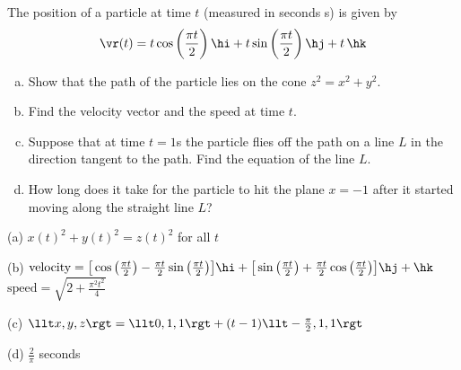 \begin{question} [M200 2002D] %
The position of a particle at time $t$ (measured in seconds s) 
is given by
\begin{equation*}
\vr(t)=t\cos\left(\frac{\pi t}{2}\right)\hi
         +t\sin\left(\frac{\pi t}{2}\right)\hj +t\,\hk
\end{equation*}
\begin{enumerate}[(a)]
\item
Show that the path of the particle lies on the cone $z^2=x^2+y^2$.
\item
Find the velocity vector and the speed at time $t$.
\item
Suppose that at time $t=1$s the particle flies off the path
on a line $L$ in the direction tangent to the path. Find the equation of
the line $L$.
\item
How long does it take for the particle to hit the plane $x=-1$
after it started moving along the straight line $L$?
\end{enumerate}
\end{question}

%

\begin{answer}
(a) $x(t)^2+y(t)^2=z(t)^2$ for all $t$ 

(b) $\text{velocity}= \big[\cos\big(\tfrac{\pi t}{2}\big)
           -\tfrac{\pi t}{2}\sin\big(\tfrac{\pi t}{2}\big)\big]\hi
         +\big[\sin\big(\tfrac{\pi t}{2}\big)
           +\tfrac{\pi t}{2}\cos\big(\tfrac{\pi t}{2}\big)\big]\hj +\hk$
\quad
$\text{speed}=\sqrt{2+\frac{\pi^2 t^2}{4}}$

(c) $\llt x,y,z\rgt = \llt 0,1,1\rgt +(t-1)\llt -\frac{\pi}{2},1,1\rgt$

(d)   $\frac{2}{\pi}$ seconds
\end{answer}


